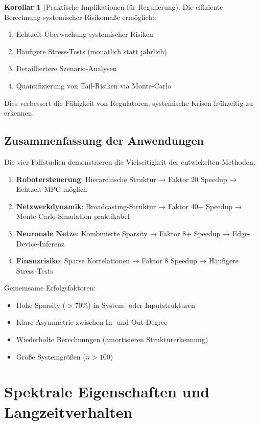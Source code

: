 \documentclass[a4paper,12pt]{report}
\theoremstyle{definition}
\newtheorem{korollar}{Korollar}
\begin{document}
	\begin{korollar}[Praktische Implikationen für Regulierung]
		Die effiziente Berechnung systemischer Risikomaße ermöglicht:
		\begin{enumerate}
			\item Echtzeit-Überwachung systemischer Risiken
			\item Häufigere Stress-Tests (monatlich statt jährlich)
			\item Detailliertere Szenario-Analysen
			\item Quantifizierung von Tail-Risiken via Monte-Carlo
		\end{enumerate}
		
		Dies verbessert die Fähigkeit von Regulatoren, systemische Krisen frühzeitig zu erkennen.
	\end{korollar}
	
	\section{Zusammenfassung der Anwendungen}
	
	Die vier Fallstudien demonstrieren die Vielseitigkeit der entwickelten Methoden:
	
	\begin{enumerate}
		\item \textbf{Robotersteuerung}: Hierarchische Struktur → Faktor 20 Speedup → Echtzeit-MPC möglich
		\item \textbf{Netzwerkdynamik}: Broadcasting-Struktur → Faktor 40+ Speedup → Monte-Carlo-Simulation praktikabel
		\item \textbf{Neuronale Netze}: Kombinierte Sparsity → Faktor 8+ Speedup → Edge-Device-Inferenz
		\item \textbf{Finanzrisiko}: Sparse Korrelationen → Faktor 8 Speedup → Häufigere Stress-Tests
	\end{enumerate}
	
	Gemeinsame Erfolgsfaktoren:
	\begin{itemize}
		\item Hohe Sparsity ($> 70\%$) in System- oder Inputstrukturen
		\item Klare Asymmetrie zwischen In- und Out-Degree
		\item Wiederholte Berechnungen (amortisieren Strukturerkennung)
		\item Große Systemgrößen ($n > 100$)
	\end{itemize}
	
	\chapter{Spektrale Eigenschaften und Langzeitverhalten}
	
\end{document}
